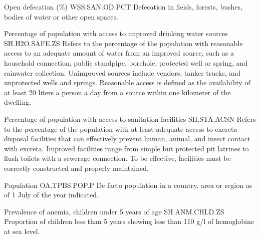 \begin{MetadataCollection}
\begin{metadata}{ Open defecation (\%) }{ WSS.SAN.OD.PCT }
Defecation in fields, forests, bushes, bodies of water or other open spaces. 
\end{metadata}

\begin{metadata}{ Percentage of population with access to improved drinking water sources  }{ SH.H2O.SAFE.ZS }
Refers to the percentage of the population with reasonable access to an adequate amount of water from an improved source, such as a household connection, public standpipe, borehole, protected well or spring, and rainwater collection. Unimproved sources include vendors, tanker trucks, and unprotected wells and springs. Reasonable access is defined as the availability of at least 20 liters a person a day from a source within one kilometer of the dwelling. 
\end{metadata}

\begin{metadata}{ Percentage of population with access to sanitation facilities }{ SH.STA.ACSN }
Refers to the percentage of the population with at least adequate access to excreta disposal facilities that can effectively prevent human, animal, and insect contact with excreta. Improved facilities range from simple but protected pit latrines to flush toilets with a sewerage connection. To be effective, facilities must be correctly constructed and properly maintained. 
\end{metadata}

\begin{metadata}{ Population }{ OA.TPBS.POP.P }
De facto population in a country, area or region as of 1 July of the year indicated.
\end{metadata}

\begin{metadata}{ Prevalence of anemia, children under 5 years of age }{ SH.ANM.CHLD.ZS }
Proportion of children less than 5 years showing less than 110 g/l of hemoglobine at sea level. 
\end{metadata}


\end{MetadataCollection}
